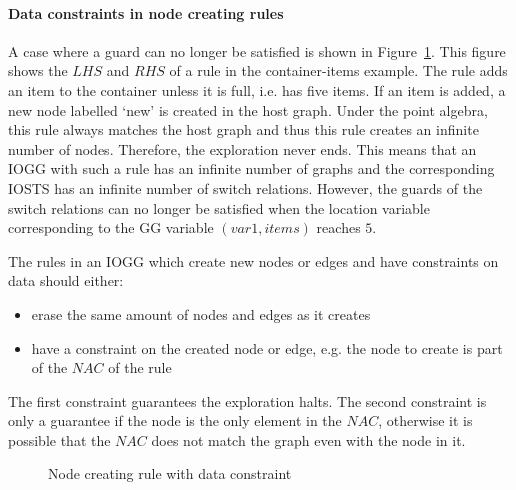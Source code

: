 \paragraph*{Data constraints in node creating rules}
A case where a guard can no longer be satisfied is shown in Figure~\ref{fig:item_example_c4}. This figure shows the $\mathit{LHS}$ and $\mathit{RHS}$ of a rule in the container-items example. The rule adds an item to the container unless it is full, i.e. has five items. If an item is added, a new node labelled `new' is created in the host graph. Under the point algebra, this rule always matches the host graph and thus this rule creates an infinite number of nodes. Therefore, the exploration never ends. This means that an IOGG with such a rule has an infinite number of graphs and the corresponding IOSTS has an infinite number of switch relations. However, the guards of the switch relations can no longer be satisfied when the location variable corresponding to the GG variable $(\mathit{var1, items})$ reaches $5$. 

The rules in an IOGG which create new nodes or edges and have constraints on data should either:
\begin{itemize}
\item erase the same amount of nodes and edges as it creates
\item have a constraint on the created node or edge, e.g. the node to create is part of the $\mathit{NAC}$ of the rule
\end{itemize}
The first constraint guarantees the exploration halts. The second constraint is only a guarantee if the node is the only element in the $\mathit{NAC}$, otherwise it is possible that the $\mathit{NAC}$ does not match the graph even with the node in it.

\begin{figure}[ht]
  \begin{center}
    \subfloat[LHS]{\label{fig:item_example_c4_lhs}\parbox[b]{6cm}{\centering}}\hspace{20px}
    \subfloat[RHS]{\label{fig:item_example_c4_rhs}\parbox[b]{6cm}{\centering}}
  \end{center}
  \caption{Node creating rule with data constraint}
  \label{fig:item_example_c4}
\end{figure}
